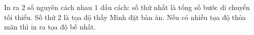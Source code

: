 In ra 2 số nguyên cách nhau 1 dấu cách: số thứ nhất là tổng số bước di chuyển tối thiểu. Số thứ 2 là tọa độ thầy Minh đặt bàn ăn. Nếu có nhiều tọa độ thỏa mãn thì in ra tọa độ bế nhất.

\